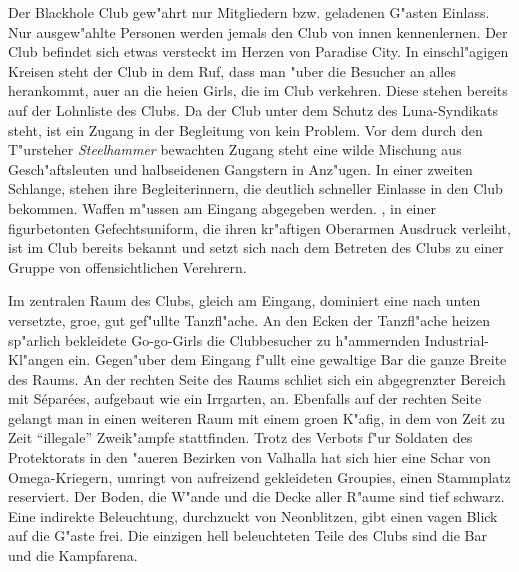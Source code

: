 
Der Blackhole Club gew"ahrt nur Mitgliedern bzw. geladenen G"asten Einlass. Nur ausgew"ahlte Personen werden jemals den Club von innen kennenlernen. Der Club befindet sich etwas versteckt im Herzen von Paradise City. In einschl"agigen Kreisen steht der Club in dem Ruf, dass man "uber die Besucher an alles herankommt, au\3er an die hei\3en Girls, die im Club verkehren. Diese stehen bereits auf der Lohnliste des Clubs. Da der Club unter dem Schutz des Luna-Syndikats steht, ist ein Zugang in der Begleitung von \xl{} kein Problem. Vor dem durch den T"ursteher \emph{Steelhammer} bewachten Zugang steht eine wilde Mischung aus Gesch"aftsleuten und halbseidenen Gangstern in Anz"ugen. In einer zweiten Schlange, stehen ihre Begleiterinnern, die deutlich schneller Einlasse in den Club bekommen. Waffen m"ussen am Eingang abgegeben werden. \xl{}, in einer figurbetonten Gefechtsuniform, die ihren kr"aftigen Oberarmen Ausdruck verleiht, ist im Club bereits bekannt und setzt sich nach dem Betreten des Clubs zu einer Gruppe von offensichtlichen Verehrern.

Im zentralen Raum des Clubs, gleich am Eingang, dominiert eine nach unten versetzte, gro\3e, gut gef"ullte Tanzfl"ache. An den Ecken der Tanzfl"ache heizen sp"arlich bekleidete Go-go-Girls die Clubbesucher zu h"ammernden Industrial-Kl"angen ein. Gegen"uber dem Eingang f"ullt eine gewaltige Bar die ganze Breite des Raums. An der rechten Seite des Raums schlie\3t sich ein abgegrenzter Bereich mit S\'epar\'ees, aufgebaut wie ein Irrgarten, an. Ebenfalls auf der rechten Seite gelangt man in einen weiteren Raum mit einem gro\3en K"afig, in dem von Zeit zu Zeit ``illegale'' Zweik"ampfe stattfinden. Trotz des Verbots f"ur Soldaten des Protektorats in den "au\3eren Bezirken von Valhalla hat sich hier eine Schar von Omega-Kriegern, umringt von aufreizend gekleideten Groupies, einen Stammplatz reserviert. Der Boden, die W"ande und die Decke aller R"aume sind tief schwarz. Eine indirekte Beleuchtung, durchzuckt von Neonblitzen, gibt einen vagen Blick auf die G"aste frei. Die einzigen hell beleuchteten Teile des Clubs sind die Bar und die Kampfarena.


